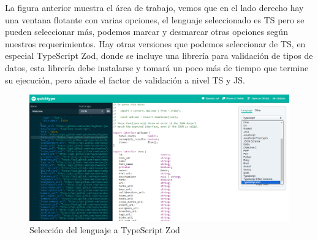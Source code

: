 La figura anterior muestra el área de trabajo, vemos que en el lado derecho hay una ventana flotante con varias opciones, el lenguaje seleccionado es TS pero se pueden seleccionar más, podemos marcar y desmarcar otras opciones según nuestros requerimientos. Hay otras versiones que podemos seleccionar de TS, en especial TypeScript Zod, donde se incluye una librería para validación de tipos de datos, esta librería debe instalarse y tomará un poco más de tiempo que termine su ejecución, pero añade el factor de validación a nivel TS y JS.
\begin{figure}[H]
    \centering
    \caption{Selección del lenguaje a TypeScript Zod}
    \label{fig:3}
    \includegraphics[width=\textwidth]{ss/3.png}
\end{figure}

